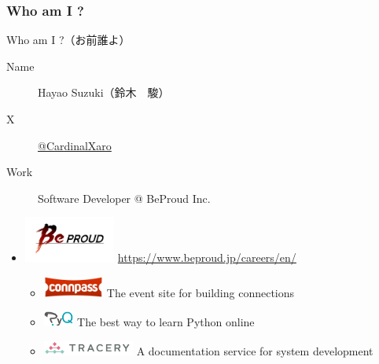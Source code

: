 \documentclass[aspectratio=169,dvipdfmx,12pt,notheorems]{beamer}
\theoremstyle{definition}
\begin{document}
\begin{frame}\frametitle{Who am I ?}

\begin{block}{Who am I ?（お前誰よ）}
\begin{description}
\item[Name] Hayao Suzuki（鈴木　駿）
\item[ X] \href{https://twitter.com/CardinalXaro}{@CardinalXaro}
\item[Work] Software Developer @ BeProud Inc.
\end{description}
\end{block}

\begin{center}
\begin{itemize}
\item \includegraphics[width=3cm]{bplogo.png}  \url{https://www.beproud.jp/careers/en/}
\begin{itemize}
\item \includegraphics[width=2cm]{connpass_logo_1.png} The event site for building connections
\item \includegraphics[width=1cm]{pyq_logo_color.png} The best way to learn Python online
\item \includegraphics[width=3cm]{tracery.png} A documentation service for system development
\end{itemize}
\end{itemize}
\end{center}

\end{frame}
\end{document}
